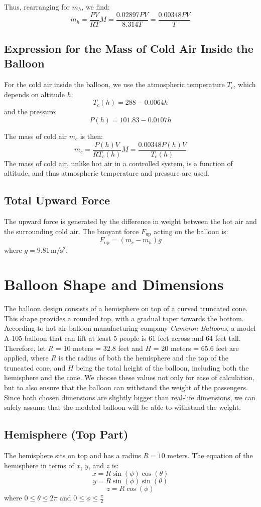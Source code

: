 \documentclass{article}
\begin{document}
Thus, rearranging for $m_h$, we find:
\[
m_h = \frac{PV}{RT} M = \frac{0.02897PV}{8.314T} = \frac{0.00348PV}{T}
\]

\subsection*{Expression for the Mass of Cold Air Inside the Balloon}
For the cold air inside the balloon, we use the atmospheric temperature $T_c$, which depends on altitude $h$:
\[
T_c(h) = 288 - 0.0064h
\]
and the pressure:
\[
P(h) = 101.83 - 0.0107h
\]

The mass of cold air $m_c$ is then:
\[
m_c = \frac{P(h)V}{R T_c(h)} M =  \frac{0.00348P(h)V}{T_c(h)}
\]
The mass of cold air, unlike hot air in a controlled system, is a function of altitude, and thus atmospheric temperature and pressure are used.
\subsection*{Total Upward Force}
The upward force is generated by the difference in weight between the hot air and the surrounding cold air. The buoyant force $F_{\text{up}}$ acting on the balloon is:
\[
F_{\text{up}} = (m_c - m_h) g
\]
where $g = 9.81 \, \mathrm{m/s^2}$.
\section*{Balloon Shape and Dimensions}

The balloon design consists of a hemisphere on top of a curved truncated cone. This shape provides a rounded top, with a gradual taper towards the bottom. According to hot air balloon manufacturing company \textit{Cameron Balloons}, a model A-105 balloon that can lift at least 5 people is 61 feet across and 64 feet tall. Therefore, let $R$ = 10 meters = 32.8 feet and $H$ = 20 meters = 65.6 feet are applied, where \( R \) is the radius of both the hemisphere and the top of the truncated cone, and \( H \) being the total height of the balloon, including both the hemisphere and the cone. We choose these values not only for ease of calculation, but to also ensure that the balloon can withstand the weight of the passengers. Since both chosen dimensions are slightly bigger than real-life dimensions, we can safely assume that the modeled balloon will be able to withstand the weight.

\subsection*{Hemisphere (Top Part)}
The hemisphere sits on top and has a radius \( R = 10 \) meters. The equation of the hemisphere in terms of \( x \), \( y \), and \( z \) is:
\[
x = R  \sin(\phi) \cos(\theta)
\]
\[
y = R  \sin(\phi) \sin(\theta)
\]
\[
z = R \cos(\phi)
\]
where \( 0 \leq \theta \leq 2\pi \) and  \( 0 \leq \phi \leq \frac{\pi}{2} \)
\end{document}
